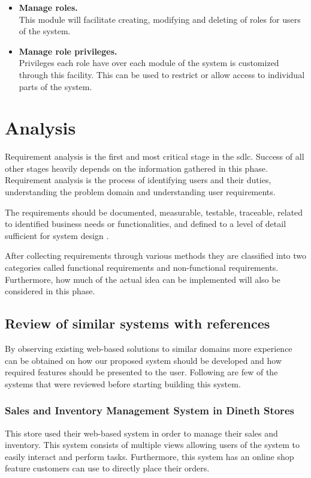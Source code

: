 \documentclass[12pt]{report}
\begin{document}
\begin{itemize}
	\item {\bf{Manage roles.}}\\
	      This module will facilitate creating, modifying and deleting of roles for users of the system.

	\item {\bf{Manage role privileges.}}\\
	      Privileges each role have over each module of the system is customized through this facility. This can be used to restrict or allow access to individual parts of the system.
\end{itemize}

\newpage
\chapter{Analysis}

Requirement analysis is the first and most critical stage in the \acrlong{sdlc}. Success of all other stages heavily depends on the information gathered in this phase. Requirement analysis is the process of identifying users and their duties, understanding the problem domain and understanding user requirements.

The requirements should be documented, measurable, testable, traceable, related to identified business needs or functionalities, and defined to a level of detail sufficient for system design \cite{sommerville_2008_software}.

After collecting requirements through various methods they are classified into two categories called functional requirements and non-functional requirements. Furthermore, how much of the actual idea can be implemented will also be considered in this phase.

\section{Review of similar systems with references}
By observing existing web-based solutions to similar domains  more experience can be obtained on how our proposed system should be developed and how required features should be presented to the user.  Following are few of the systems that were reviewed before starting building this system.

\subsection{Sales and Inventory Management System in Dineth Stores}
This store used their web-based system in order to manage their sales and inventory. This system consists of multiple views allowing users of the system to easily interact and perform tasks.  Furthermore, this system has an online shop feature customers can use to directly place their orders.
\end{document}
